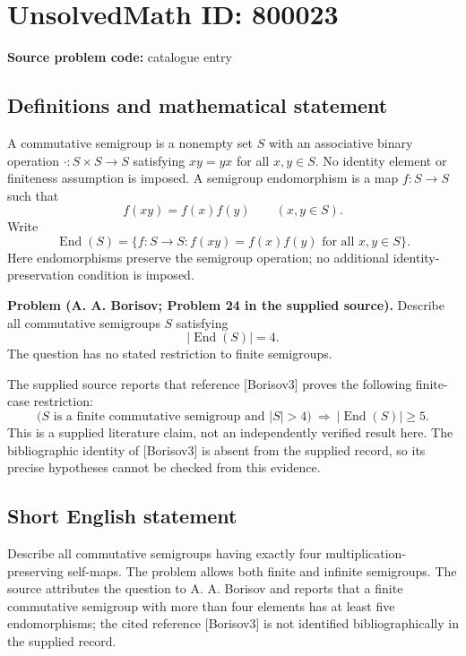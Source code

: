 \documentclass[11pt]{article}
\begin{document}
\section*{UnsolvedMath ID: 800023}
\textbf{Source problem code:} catalogue entry
\subsection{Definitions and mathematical statement}
A commutative semigroup is a nonempty set \(S\) with an associative binary operation \(\cdot:S\times S\to S\) satisfying \(xy=yx\) for all \(x,y\in S\). No identity element or finiteness assumption is imposed. A semigroup endomorphism is a map \(f:S\to S\) such that
\[
 f(xy)=f(x)f(y)\qquad(x,y\in S).
\]
Write
\[
 \operatorname{End}(S)=\{f:S\to S: f(xy)=f(x)f(y)\text{ for all }x,y\in S\}.
\]
Here endomorphisms preserve the semigroup operation; no additional identity-preservation condition is imposed.

\textbf{Problem (A. A. Borisov; Problem 24 in the supplied source).} Describe all commutative semigroups \(S\) satisfying
\[
 \lvert\operatorname{End}(S)\rvert=4.
\]
The question has no stated restriction to finite semigroups.

The supplied source reports that reference [Borisov3] proves the following finite-case restriction:
\[
 \bigl(S\text{ is a finite commutative semigroup and }|S|>4\bigr)
 \ \Longrightarrow\ |\operatorname{End}(S)|\geq 5.
\]
This is a supplied literature claim, not an independently verified result here. The bibliographic identity of [Borisov3] is absent from the supplied record, so its precise hypotheses cannot be checked from this evidence.
\subsection{Short English statement}
Describe all commutative semigroups having exactly four multiplication-preserving self-maps. The problem allows both finite and infinite semigroups. The source attributes the question to A. A. Borisov and reports that a finite commutative semigroup with more than four elements has at least five endomorphisms; the cited reference [Borisov3] is not identified bibliographically in the supplied record.
\end{document}
